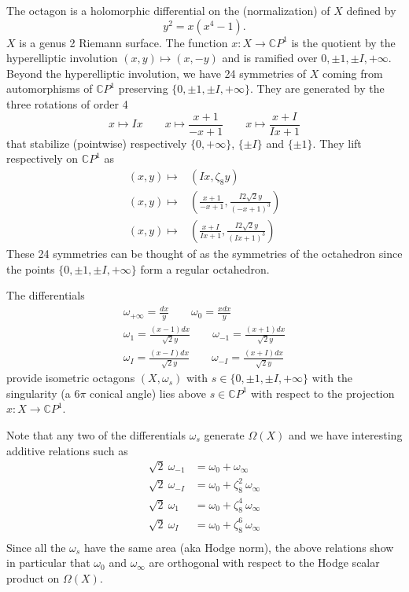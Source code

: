 \documentclass[a4paper,12pt]{article}
\def\bC{\mathbb{C}}
\begin{document}
The octagon is a holomorphic differential on the (normalization) of $X$ defined by
\[
y^2 = x (x^4 - 1).
\]
$X$ is a genus 2 Riemann surface. The function $x: X \to \bC P^1$ is the quotient by the hyperelliptic
involution $(x, y) \mapsto (x, -y)$ and is ramified over $0, \pm 1, \pm I, +\infty$. Beyond
the hyperelliptic involution, we have 24 symmetries of $X$ coming from automorphisms
of $\bC P^1$ preserving $\{0, \pm 1, \pm I, +\infty\}$. They are generated by the three
rotations of order 4
\[
x \mapsto I x
\qquad
x \mapsto \frac{x + 1}{-x + 1}
\qquad
x \mapsto \frac{x + I}{Ix + 1}
\]
that stabilize (pointwise) respectively $\{0,+\infty\}$, $\{\pm I\}$ and $\{\pm 1\}$. They lift
respectively on $\bC P^1$ as
\begin{align*}
(x, y) \mapsto &
\left(
Ix, \zeta_8 y
\right)
\\
(x, y) \mapsto &
\left(
\frac{x+1}{-x+1}, \frac{I 2 \sqrt{2} y}{(-x+1)^3}
\right)
\\
(x, y) \mapsto &
\left(
\frac{x+I}{Ix+1}, \frac{I 2 \sqrt{2} y}{(Ix+1)^3}
\right)
\end{align*}
These 24 symmetries can be thought of as the symmetries of the octahedron since the points $\{0,\pm 1, \pm I, +\infty\}$
form a regular octahedron.

The differentials
\begin{align*}
\omega_{+\infty} = \frac{dx}{y} \qquad
\omega_0 = \frac{x dx}{y} \\
\omega_1 = \frac{(x-1)dx}{\sqrt{2} y}
\qquad
\omega_{-1} = \frac{(x+1)dx}{\sqrt{2} y}
\\
\omega_I = \frac{(x-I)dx}{\sqrt{2} y} \qquad
\omega_{-I}= \frac{(x+I)dx}{\sqrt{2} y}
\end{align*}
provide isometric octagons $(X, \omega_s)$ with $s \in \{0, \pm 1, \pm I, +\infty\}$
with the singularity (a $6\pi$ conical angle) lies above $s \in \bC P^1$ 
with respect to the projection $x: X \to \bC P^1$.

Note that any two of the differentials $\omega_s$ generate $\Omega(X)$ and we have
interesting additive relations such as
\begin{align*}
 \sqrt{2}\ \omega_{-1} &= \omega_0 + \omega_\infty \\
 \sqrt{2}\ \omega_{-I} &= \omega_0 + \zeta_8^2\ \omega_\infty \\
 \sqrt{2}\ \omega_1 &= \omega_0 + \zeta_8^4\ \omega_\infty \\
 \sqrt{2}\ \omega_I &= \omega_0 + \zeta_8^6\ \omega_\infty \\
\end{align*}
Since all the $\omega_s$ have the same area (aka Hodge norm), the above
relations show in particular that $\omega_0$ and $\omega_\infty$ are
orthogonal with respect to the Hodge scalar product on $\Omega(X)$.
\end{document}
